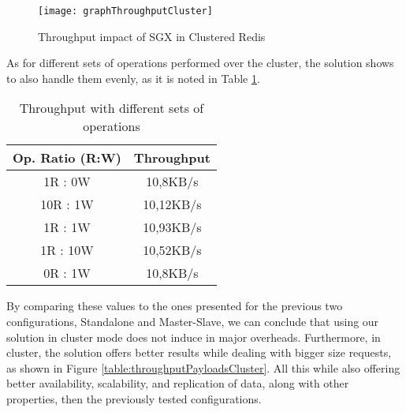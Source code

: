 \begin{figure}[htbp]
	\centering
	{\texttt{[image: graphThroughputCluster]}}
	\caption{Throughput impact of SGX in Clustered Redis}
	\label{fig:graphTroughputCluster}
\end{figure}

\vspace{40mm}

As for different sets of operations performed over the cluster, the solution shows to also handle them evenly, as it is noted in Table \ref{table:thptDiffRatiosClusterRedis}.

\begin{table}[ht]
	\caption{Throughput with different sets of operations} %
	\centering %
	\begin{tabular}{c c} %
		\hline\hline %
		\textbf{Op. Ratio (R:W)} & \textbf{Throughput} \\ [0.3ex] %
		\hline
		1R : 0W & 10,8KB/s\\
		\hline
		10R : 1W & 10,12KB/s \\
		\hline
		1R : 1W & 10,93KB/s\\
		\hline %
		1R : 10W & 10,52KB/s\\
		\hline 
		0R : 1W & 10,8KB/s\\ [0.3ex] %
		\hline %
	\end{tabular}
	\label{table:thptDiffRatiosClusterRedis} %
\end{table}

By comparing these values to the ones presented for the previous two configurations, Standalone and Master-Slave, we can conclude that using our solution in cluster mode does not induce in major overheads. Furthermore, in cluster, the solution offers better results while dealing with bigger size requests, as shown in Figure \ref{table:throughputPayloadsCluster}. All this while also offering better availability, scalability, and replication of data, along with other properties, then the previously tested configurations.

